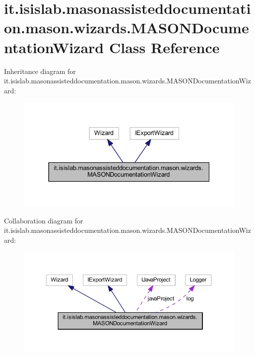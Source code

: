 \hypertarget{classit_1_1isislab_1_1masonassisteddocumentation_1_1mason_1_1wizards_1_1_m_a_s_o_n_documentation_wizard}{\section{it.\-isislab.\-masonassisteddocumentation.\-mason.\-wizards.\-M\-A\-S\-O\-N\-Documentation\-Wizard Class Reference}
\label{classit_1_1isislab_1_1masonassisteddocumentation_1_1mason_1_1wizards_1_1_m_a_s_o_n_documentation_wizard}
}


Inheritance diagram for it.\-isislab.\-masonassisteddocumentation.\-mason.\-wizards.\-M\-A\-S\-O\-N\-Documentation\-Wizard\-:\nopagebreak
\begin{figure}[H]
\begin{center}
\leavevmode
\includegraphics[width=337pt]{classit_1_1isislab_1_1masonassisteddocumentation_1_1mason_1_1wizards_1_1_m_a_s_o_n_documentation_wizard__inherit__graph}
\end{center}
\end{figure}


Collaboration diagram for it.\-isislab.\-masonassisteddocumentation.\-mason.\-wizards.\-M\-A\-S\-O\-N\-Documentation\-Wizard\-:\nopagebreak
\begin{figure}[H]
\begin{center}
\leavevmode
\includegraphics[width=350pt]{classit_1_1isislab_1_1masonassisteddocumentation_1_1mason_1_1wizards_1_1_m_a_s_o_n_documentation_wizard__coll__graph}
\end{center}
\end{figure}
